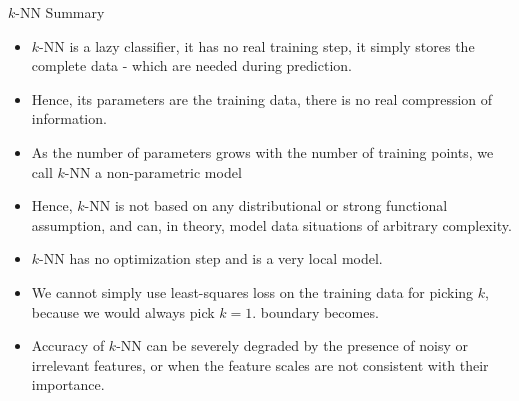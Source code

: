 \documentclass[11pt,compress,t,notes=noshow, xcolor=table]{beamer}
\begin{document}
\begin{vbframe}{$k$-NN Summary}

  \begin{itemize}
  \item $k$-NN is a lazy classifier, it has no real training step, it simply stores the complete data 
    - which are needed during prediction. 
  \item Hence, its parameters are the training data, there is no real compression of information.
  \item As the number of parameters grows with the number of training points, we call 
    $k$-NN a non-parametric model
  \item Hence, $k$-NN is not based on any distributional or strong functional assumption,
    and can, in theory, model data situations of arbitrary complexity.  
  \item $k$-NN has no optimization step and is a very local model.  
  \item We cannot simply use least-squares loss on the training data for picking $k$,
    because we would always pick $k=1$.  
    boundary becomes.  
  \item Accuracy of $k$-NN can be severely degraded by the presence of noisy or irrelevant features,
    or when the feature scales are not consistent with their importance.
  \end{itemize}

% 
% 
% 
% 
% 
% 

\end{vbframe}
\end{document}
